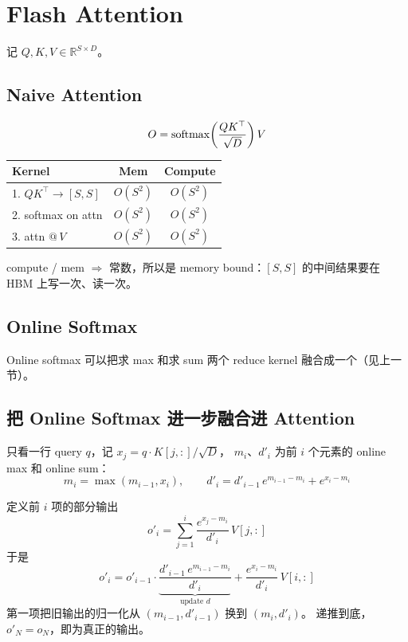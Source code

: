 \section{Flash Attention}

记 $Q, K, V \in \mathbb{R}^{S \times D}$。

\subsection{Naive Attention}

\begin{equation}
  O = \operatorname{softmax}\!\left(\frac{QK^\top}{\sqrt{D}}\right) V
\end{equation}

\begin{center}
\begin{tabular}{l|c|c}
  Kernel & Mem & Compute \\
  \hline
  1. $QK^\top \to [S, S]$ & $O(S^2)$ & $O(S^2)$\footnotemark \\
  2. softmax on attn       & $O(S^2)$ & $O(S^2)$ \\
  3. attn $@\, V$          & $O(S^2)$ & $O(S^2)$ \\
\end{tabular}
\end{center}

compute / mem $\Rightarrow$ 常数，所以是 memory bound：$[S, S]$ 的中间结果要在 HBM 上写一次、读一次。

\subsection{Online Softmax}

Online softmax 可以把求 max 和求 sum 两个 reduce kernel 融合成一个（见上一节）。

\subsection{把 Online Softmax 进一步融合进 Attention}

只看一行 query $q$，记 $x_j = q \cdot K[j,:] / \sqrt{D}$，
$m_i$、$d'_i$ 为前 $i$ 个元素的 online max 和 online sum：
\begin{equation}
  m_i = \max(m_{i-1}, x_i), \qquad
  d'_i = d'_{i-1}\, e^{m_{i-1} - m_i} + e^{x_i - m_i}
\end{equation}

定义前 $i$ 项的部分输出
\begin{equation}
  o'_i = \sum_{j=1}^{i} \frac{e^{x_j - m_i}}{d'_i}\, V[j,:]
\end{equation}
于是
\begin{equation}
  o'_i = o'_{i-1} \cdot \underbrace{\frac{d'_{i-1}\, e^{m_{i-1} - m_i}}{d'_i}}_{\text{update } d}
       + \frac{e^{x_i - m_i}}{d'_i}\, V[i,:]
\end{equation}
第一项把旧输出的归一化从 $(m_{i-1}, d'_{i-1})$ 换到 $(m_i, d'_i)$。
递推到底，$o'_N = o_N$，即为真正的输出。

